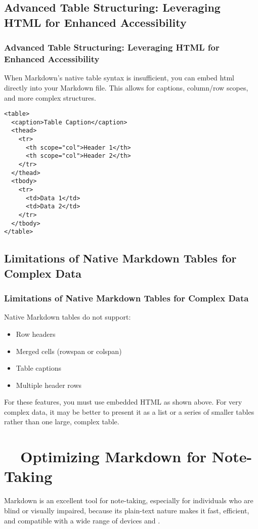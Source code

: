 \subsection{Advanced Table Structuring: Leveraging HTML for Enhanced Accessibility}
\label{subsec:markdown-html-tables}
\subsubsection{Advanced Table Structuring: Leveraging HTML for Enhanced Accessibility}
\label{ssubsec:markdown-html-tables-details}
When Markdown's native table syntax is insufficient, you can embed \gls{html} directly into your Markdown file. This allows for captions, column/row scopes, and more complex structures.
\begin{verbatim}
<table>
  <caption>Table Caption</caption>
  <thead>
    <tr>
      <th scope="col">Header 1</th>
      <th scope="col">Header 2</th>
    </tr>
  </thead>
  <tbody>
    <tr>
      <td>Data 1</td>
      <td>Data 2</td>
    </tr>
  </tbody>
</table>
\end{verbatim}

\subsection{Limitations of Native Markdown Tables for Complex Data}
\label{subsec:markdown-table-limitations}
\subsubsection{Limitations of Native Markdown Tables for Complex Data}
\label{ssubsec:markdown-table-limitations-details}
Native Markdown tables do not support:
\begin{itemize}
	\item Row headers
	\item Merged cells (rowspan or colspan)
	\item Table captions
	\item Multiple header rows
\end{itemize}
For these features, you must use embedded HTML as shown above. For very complex data, it may be better to present it as a list or a series of smaller tables rather than one large, complex table.

\section{~~Optimizing Markdown for Note-Taking}
\label{sec:markdown-for-notetaking}
Markdown is an excellent tool for note-taking, especially for individuals who are blind or visually impaired, because its plain-text nature makes it fast, efficient, and compatible with a wide range of devices and .

